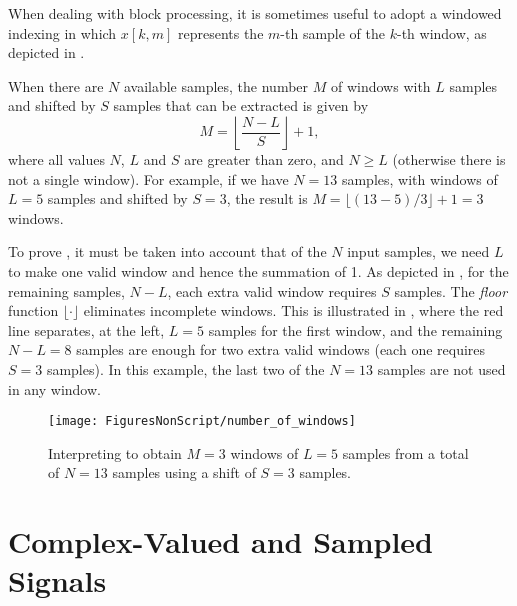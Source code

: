 When dealing with block processing, it is sometimes useful to adopt a windowed indexing in which $x[k,m]$ represents the $m$-th sample of the $k$-th window, as depicted in .

When there are $N$ available samples, the number $M$ of windows with $L$ samples and shifted by $S$ samples that can be extracted is given by
\begin{equation}
M = \left\lfloor \frac{N-L}{S} \right\rfloor + 1,
\label{eq:num_of_windows}
\end{equation}
where all values $N$, $L$ and $S$ are greater than zero, and $N \ge L$ (otherwise there is not a single window). For example, if we have $N=13$ samples, with windows of $L=5$ samples and shifted by $S=3$, the result is $M = \lfloor (13-5)/3 \rfloor + 1 = 3$ windows.

To prove , it must be taken into account that of the $N$ input samples, we need $L$ to make one valid window
and hence the summation of 1. As depicted in , for the remaining samples, $N-L$, each extra valid window requires $S$ samples. The \emph{floor} function $\lfloor \cdot \rfloor$ eliminates incomplete windows.
This is illustrated in , where the red line separates, at the left, $L=5$ samples for the first window, and the remaining $N-L=8$ samples are enough for two extra valid windows (each one requires $S=3$ samples). In this example, the last two of the $N=13$ samples are not used in any window.

\begin{figure}
	\centering
		\texttt{[image: FiguresNonScript/number\_of\_windows]}
	\caption{Interpreting  to obtain $M=3$ windows of $L=5$ samples from a total of $N=13$ samples using a shift of $S=3$ samples.\label{fig:number_of_windows}}
\end{figure}



\section{{\akadvanced} Complex-Valued and Sampled Signals}
\label{sec:representing_signals}


